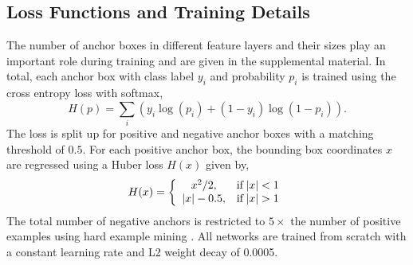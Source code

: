 \subsection{Loss Functions and Training Details}\label{sec:training}
The number of anchor boxes in different feature layers and their sizes play an important role during training and are given in the supplemental material. In total, each anchor box with class label $y_i$ and probability $p_i$ is trained using the cross entropy loss with softmax, 
\vspace{-5pt}
\begin{equation}
H(p)=\sum_i (y_i\log(p_i)+(1 - y_i)\log(1 - p_i)).
\end{equation}
The loss is split up for positive and negative anchor boxes with a matching threshold of $0.5$. For each positive anchor box, the bounding box coordinates $x$ are regressed using a Huber loss $H(x)$ given by,
\vspace{-10pt}
\begin{equation}
H(x)=\left\lbrace
\begin{array}{cc}
x^2 / 2, &  \mathrm{if} \left|x\right| < 1\\
\left|x\right| - 0.5, &    \mathrm{if} \left|x\right| > 1
\end{array}\right.\vspace{-4pt}
\end{equation}
The total number of negative anchors is restricted to $5 \times$ the number of positive examples using hard example mining \cite{SSDLiu2015,Shrivastava16}. All networks are trained from scratch with a constant learning rate and L2 weight decay of 0.0005. 